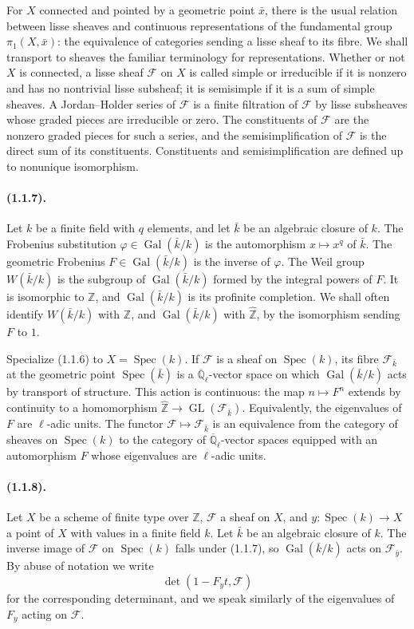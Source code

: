 \documentclass[11pt]{article}
\theoremstyle{remark}
\newcommand{\Qlb}{\overline{\mathbb{Q}}_\ell}
\newcommand{\Spec}{\operatorname{Spec}}
\newcommand{\GL}{\operatorname{GL}}
\newcommand{\Gal}{\operatorname{Gal}}
\begin{document}
For $X$ connected and pointed by a geometric point $\bar x$, there is the usual relation between lisse sheaves and continuous representations of the fundamental group $\pi_1(X,\bar x)$: the equivalence of categories sending a lisse sheaf to its fibre. We shall transport to sheaves the familiar terminology for representations. Whether or not $X$ is connected, a lisse sheaf $\mathcal F$ on $X$ is called simple or irreducible if it is nonzero and has no nontrivial lisse subsheaf; it is semisimple if it is a sum of simple sheaves. A Jordan--Holder series of $\mathcal F$ is a finite filtration of $\mathcal F$ by lisse subsheaves whose graded pieces are irreducible or zero. The constituents of $\mathcal F$ are the nonzero graded pieces for such a series, and the semisimplification of $\mathcal F$ is the direct sum of its constituents. Constituents and semisimplification are defined up to nonunique isomorphism.

\paragraph{(1.1.7).} Let $k$ be a finite field with $q$ elements, and let $\bar k$ be an algebraic closure of $k$. The Frobenius substitution $\varphi\in\Gal(\bar k/k)$ is the automorphism $x\mapsto x^q$ of $\bar k$. The geometric Frobenius $F\in\Gal(\bar k/k)$ is the inverse of $\varphi$. The Weil group $W(\bar k/k)$ is the subgroup of $\Gal(\bar k/k)$ formed by the integral powers of $F$. It is isomorphic to $\mathbb Z$, and $\Gal(\bar k/k)$ is its profinite completion. We shall often identify $W(\bar k/k)$ with $\mathbb Z$, and $\Gal(\bar k/k)$ with $\widehat{\mathbb Z}$, by the isomorphism sending $F$ to $1$.

Specialize (1.1.6) to $X=\Spec(k)$. If $\mathcal F$ is a sheaf on $\Spec(k)$, its fibre $\mathcal F_{\bar k}$ at the geometric point $\Spec(\bar k)$ is a $\Qlb$-vector space on which $\Gal(\bar k/k)$ acts by transport of structure. This action is continuous: the map $n\mapsto F^n$ extends by continuity to a homomorphism $\widehat{\mathbb Z}\to \GL(\mathcal F_{\bar k})$. Equivalently, the eigenvalues of $F$ are $\ell$-adic units. The functor $\mathcal F\mapsto\mathcal F_{\bar k}$ is an equivalence from the category of sheaves on $\Spec(k)$ to the category of $\Qlb$-vector spaces equipped with an automorphism $F$ whose eigenvalues are $\ell$-adic units.

\paragraph{(1.1.8).} Let $X$ be a scheme of finite type over $\mathbb Z$, $\mathcal F$ a sheaf on $X$, and $y:\Spec(k)\to X$ a point of $X$ with values in a finite field $k$. Let $\bar k$ be an algebraic closure of $k$. The inverse image of $\mathcal F$ on $\Spec(k)$ falls under (1.1.7), so $\Gal(\bar k/k)$ acts on $\mathcal F_{\bar y}$. By abuse of notation we write
\[
\det(1-F_y t,\mathcal F)
\]
for the corresponding determinant, and we speak similarly of the eigenvalues of $F_y$ acting on $\mathcal F$.
\end{document}
